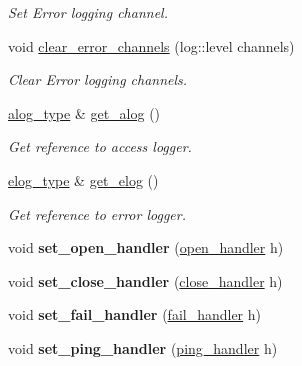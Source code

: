 \begin{DoxyCompactItemize}
\begin{DoxyCompactList}\small\item\em Set Error logging channel. \end{DoxyCompactList}\item 
void \hyperlink{classwebsocketpp_1_1endpoint_a8cefa4fc37c0df4eb6ed0bcf04bb0da5}{clear\+\_\+error\+\_\+channels} (log\+::level channels)
\begin{DoxyCompactList}\small\item\em Clear Error logging channels. \end{DoxyCompactList}\item 
\hyperlink{classwebsocketpp_1_1endpoint_a1ca2ad5bfdd241a031746c3f158f4003}{alog\+\_\+type} \& \hyperlink{classwebsocketpp_1_1endpoint_a1607d873b9e764c02563162f03171326}{get\+\_\+alog} ()
\begin{DoxyCompactList}\small\item\em Get reference to access logger. \end{DoxyCompactList}\item 
\hyperlink{classwebsocketpp_1_1endpoint_a4ab98f4fed5b5b2740105eff732c7b1e}{elog\+\_\+type} \& \hyperlink{classwebsocketpp_1_1endpoint_a63ed630042ce9549dfc7d9513cb19678}{get\+\_\+elog} ()
\begin{DoxyCompactList}\small\item\em Get reference to error logger. \end{DoxyCompactList}\item 
void {\bfseries set\+\_\+open\+\_\+handler} (\hyperlink{namespacewebsocketpp_a53c8b4ae59cf13b5f883b119bbd14d72}{open\+\_\+handler} h)\hypertarget{classwebsocketpp_1_1endpoint_a5753d9848aefc04ee91da401c0cc65b8}{}\label{classwebsocketpp_1_1endpoint_a5753d9848aefc04ee91da401c0cc65b8}

\item 
void {\bfseries set\+\_\+close\+\_\+handler} (\hyperlink{namespacewebsocketpp_a27acb39e01cbca06ccc4e4e8eb8f877d}{close\+\_\+handler} h)\hypertarget{classwebsocketpp_1_1endpoint_a8d7d95bebc154879655211e2b0b5e069}{}\label{classwebsocketpp_1_1endpoint_a8d7d95bebc154879655211e2b0b5e069}

\item 
void {\bfseries set\+\_\+fail\+\_\+handler} (\hyperlink{namespacewebsocketpp_a5bb2e61cfe649b2e012f1a2c5693a4d5}{fail\+\_\+handler} h)\hypertarget{classwebsocketpp_1_1endpoint_a073540365f5c810f5a45e5fc76f52f87}{}\label{classwebsocketpp_1_1endpoint_a073540365f5c810f5a45e5fc76f52f87}

\item 
void {\bfseries set\+\_\+ping\+\_\+handler} (\hyperlink{namespacewebsocketpp_a9dcaaa7370865f1bcacb55ae715793ef}{ping\+\_\+handler} h)\hypertarget{classwebsocketpp_1_1endpoint_adc6caf0164a0cd073f0535078ccac123}{}\label{classwebsocketpp_1_1endpoint_adc6caf0164a0cd073f0535078ccac123}


\end{DoxyCompactItemize}
